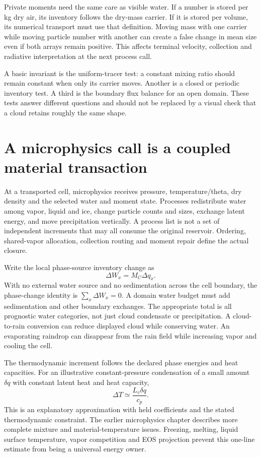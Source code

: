 Private moments need the same care as visible water. If a number is stored per
kg dry air, its inventory follows the dry-mass carrier. If it is stored per
volume, its numerical transport must use that definition. Moving mass with one
carrier while moving particle number with another can create a false change in
mean size even if both arrays remain positive. This affects terminal velocity,
collection and radiative interpretation at the next process call.

A basic invariant is the uniform-tracer test: a constant mixing ratio should
remain constant when only its carrier moves. Another is a closed or periodic
inventory test. A third is the boundary flux balance for an open domain. These
tests answer different questions and should not be replaced by a visual check
that a cloud retains roughly the same shape.

\section{A microphysics call is a coupled material transaction}

At a transported cell, microphysics receives pressure, temperature/theta,
dry density and the selected water and moment state. Processes redistribute
water among vapor, liquid and ice, change particle counts and sizes, exchange
latent energy, and move precipitation vertically. A process list is not a
set of independent increments that may all consume the original reservoir.
Ordering, shared-vapor allocation, collection routing and moment repair define
the actual closure.

Write the local phase-source inventory change as
\[
 \Delta W_x=M_C\Delta q_x.
\]
With no external water source and no sedimentation across the cell boundary,
the phase-change identity is $\sum_x\Delta W_x=0$. A domain water budget must
add sedimentation and other boundary exchanges. The appropriate total is all
prognostic water categories, not just cloud condensate or precipitation.
A cloud-to-rain conversion can reduce displayed cloud while conserving water.
An evaporating raindrop can disappear from the rain field while increasing
vapor and cooling the cell.

The thermodynamic increment follows the declared phase energies and heat
capacities. For an illustrative constant-pressure condensation of a small
amount $\delta q$ with constant latent heat and heat capacity,
\[
 \Delta T\simeq \frac{L_v\delta q}{c_p}.
\]
This is an explanatory approximation with held coefficients and the stated
thermodynamic constraint. The earlier microphysics chapter describes more
complete mixture and material-temperature issues. Freezing, melting, liquid
surface temperature, vapor competition and EOS projection prevent this
one-line estimate from being a universal energy owner.

